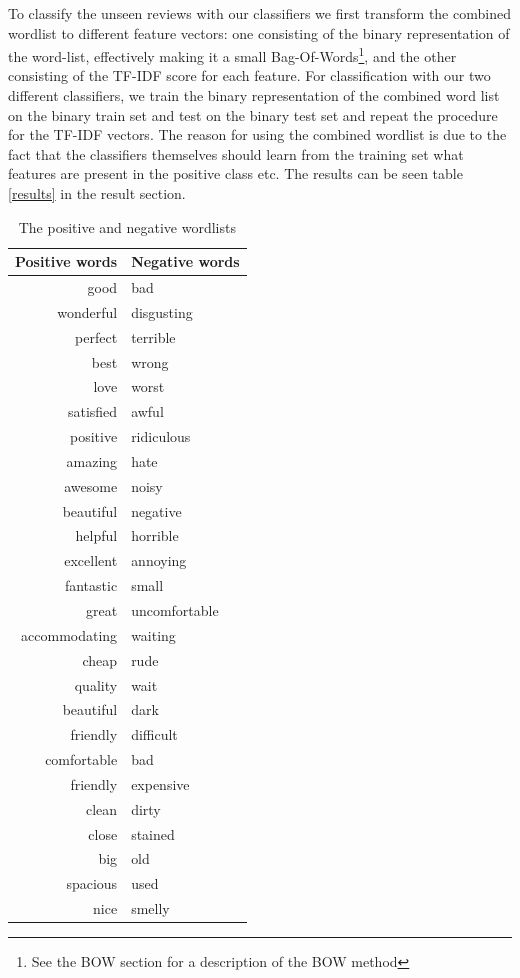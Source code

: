 \documentclass{article}
\begin{document}
To classify the unseen reviews with our classifiers we first transform the combined wordlist to different feature vectors: one consisting of the binary representation of the word-list, effectively making it a small Bag-Of-Words\footnote{See the BOW section for a description of the BOW method}, and the other consisting of the TF-IDF score for each feature. 
For classification with our two different classifiers, we train the binary representation of the combined word list on the binary train set and test on the binary test set and repeat the procedure for the TF-IDF vectors.
The reason for using the combined wordlist is due to the fact that the classifiers themselves should learn from the training set what features are present in the positive class etc. The results can be seen table \ref{results} in the result section.


\begin{table}[ht!]
\centering
\begin{tabular}{ r | l }
 Positive words & Negative words \\
\hline \hline 
good & bad \\
wonderful & disgusting \\
perfect & terrible \\
best & wrong\\
love & worst\\
satisfied & awful\\
positive & ridiculous\\
amazing & hate\\
awesome & noisy\\
beautiful & negative\\
helpful & horrible\\
excellent & annoying\\
fantastic & small\\
great & uncomfortable\\
accommodating & waiting\\
cheap & rude\\
quality & wait\\
beautiful & dark\\
friendly & difficult\\
comfortable & bad\\
friendly & expensive\\
clean & dirty\\
close & stained\\
big & old\\
spacious & used\\
nice & smelly\\
\hline 
\end{tabular}
\caption{The positive and negative wordlists}
\label{tab:wordlist}
\end{table}
\end{document}
